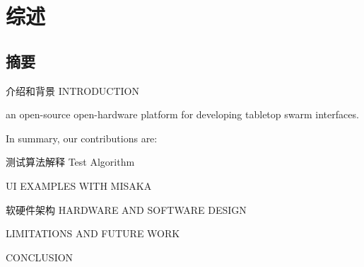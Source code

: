 \chapter{综述}
\label{cha:Overview}

\section{摘要}

介绍和背景 INTRODUCTION

an open-source open-hardware platform for developing tabletop swarm interfaces.

In summary, our contributions are:


测试算法解释 Test Algorithm

UI EXAMPLES WITH MISAKA

软硬件架构 HARDWARE AND SOFTWARE DESIGN

LIMITATIONS AND FUTURE WORK

CONCLUSION